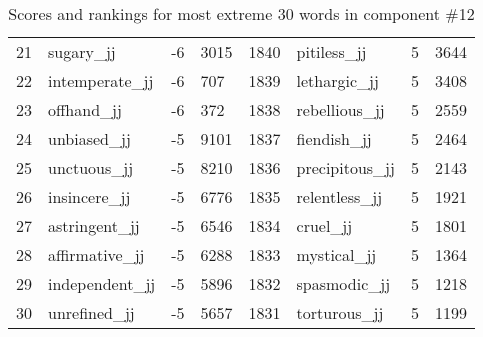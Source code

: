 \begin{table}[tbp]
\begin{tabular}{| rlr@{.}l | rlr@{.}l |}
    21 & sugary\_jj & -6 & 3015    &    1840 & pitiless\_jj & 5 & 3644 \\
    22 & intemperate\_jj & -6 & 707    &    1839 & lethargic\_jj & 5 & 3408 \\
    23 & offhand\_jj & -6 & 372    &    1838 & rebellious\_jj & 5 & 2559 \\
    24 & unbiased\_jj & -5 & 9101    &    1837 & fiendish\_jj & 5 & 2464 \\
    25 & unctuous\_jj & -5 & 8210    &    1836 & precipitous\_jj & 5 & 2143 \\
    26 & insincere\_jj & -5 & 6776    &    1835 & relentless\_jj & 5 & 1921 \\
    27 & astringent\_jj & -5 & 6546    &    1834 & cruel\_jj & 5 & 1801 \\
    28 & affirmative\_jj & -5 & 6288    &    1833 & mystical\_jj & 5 & 1364 \\
    29 & independent\_jj & -5 & 5896    &    1832 & spasmodic\_jj & 5 & 1218 \\
    30 & unrefined\_jj & -5 & 5657    &    1831 & torturous\_jj & 5 & 1199 \\
    \hline
    \end{tabular}
    \caption{Scores and rankings for most extreme 30 words in component \#12} 
\end{table}
\clearpage
